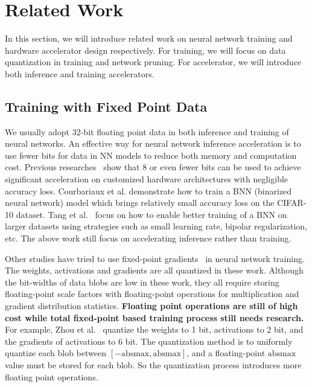 \section{Related Work}\label{sec:rw}
In this section, we will introduce related work on neural network training and hardware accelerator design respectively. For training, we will focus on data quantization in training and network pruning. For accelerator, we will introduce both inference and training accelerators.

\subsection{Training with Fixed Point Data}\label{sec:rw:fixed_train}
We usually adopt 32-bit floating point data in both inference and training of neural networks. An effective way for neural network inference acceleration is to use fewer bits for data in NN models to reduce both memory and computation cost. Previous researches~\cite{han2016eie,qiu2016going} show that 8 or even fewer bits can be used to achieve significant acceleration on customized hardware architectures with negligible accuracy loss. Courbariaux et al.\cite{hubara2016binarized} demonstrate how to train a BNN (binarized neural network) model which brings relatively small accuracy loss on the CIFAR-10 dataset. Tang et al.~\cite{tang2017train} focus on how to enable better training of a BNN on larger datasets using strategies such as small learning rate, bipolar regularization, etc. The above work still focus on accelerating inference rather than training.

Other studies have tried to use fixed-point gradients~\cite{hubara2016binarized, hubara2017quantized, zhou2016dorefa} in neural network training. The weights, activations and gradients are all quantized in these work. Although the bit-widths of data blobs are low in these work, they all require storing floating-point scale factors with floating-point operations for multiplication and gradient distribution statistics.  {\bf{Floating point operations are still of high cost while total fixed-point based training process still needs research.}} For example, Zhou et al.~\cite{zhou2016dorefa} quantize the weights to 1 bit, activations to 2 bit, and the gradients of activations to 6 bit. The quantization method is to uniformly quantize each blob between $[-\mbox{absmax}, \mbox{absmax}]$, and a floating-point $\mbox{absmax}$ value must be stored for each blob. So the quantization process introduces more floating point operations.

